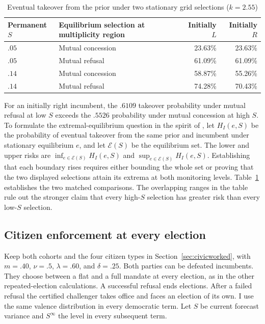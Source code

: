 \documentclass[11pt,letterpaper]{article}
\begin{document}
\begin{table}[htbp]\centering\small
\caption{Eventual takeover from the prior under two stationary grid selections ($k=2.55$)}\label{tab:risk}
\smallskip
\begin{tabular}{@{}llrr@{}}
\toprule
Permanent $S$ & Equilibrium selection at multiplicity region & Initially $L$ & Initially $R$\\ \midrule
$.05$ & Mutual concession & 23.63\% & 23.63\%\\
$.05$ & Mutual refusal    & 61.09\% & 61.09\%\\
$.14$ & Mutual concession & 58.87\% & 55.26\%\\
$.14$ & Mutual refusal    & 74.28\% & 70.43\%\\ \bottomrule
\end{tabular}
\end{table}
For an initially right incumbent, the $.6109$ takeover probability under mutual refusal at low $S$ exceeds the $.5526$ probability under mutual concession at high $S$. To formulate the extremal-equilibrium question in the spirit of \citet{milgromroberts}, let $H_I(e,S)$ be the probability of eventual takeover from the same prior and incumbent under stationary equilibrium $e$, and let $\mathcal E(S)$ be the equilibrium set. The lower and upper risks are $\inf_{e\in\mathcal E(S)}H_I(e,S)$ and $\sup_{e\in\mathcal E(S)}H_I(e,S)$. Establishing that each boundary rises requires either bounding the whole set or proving that the two displayed selections attain its extrema at both monitoring levels. Table~\ref{tab:risk} establishes the two matched comparisons. The overlapping ranges in the table rule out the stronger claim that every high-$S$ selection has greater risk than every low-$S$ selection.
\subsection{Citizen enforcement at every election}\label{sec:civicmpe}

Keep both cohorts and the four citizen types in Section~\ref{sec:civicworked}, with $m=.40$, $\nu=.5$, $\lambda=.60$, and $\delta=.25$. Both parties can be defeated incumbents. They choose between a flat and a full mandate at every election, as in the other repeated-election calculations. A successful refusal ends elections. After a failed refusal the certified challenger takes office and faces an election of its own. I use the same valence distribution in every democratic term. Let $S$ be current forecast variance and $S^\infty$ the level in every subsequent term.
\end{document}
